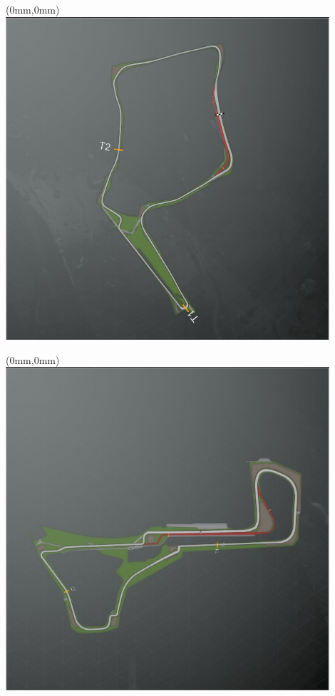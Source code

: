 \null\newpage
\begin{textblock*}{30mm}(0mm,0mm)%
\includegraphics[width=120mm]{TR/2015-05-20_00049.png}
\end{textblock*}
\null\newpage
\begin{textblock*}{30mm}(0mm,0mm)%
\includegraphics[width=120mm]{TR/2015-05-20_00071.png}
\end{textblock*}

